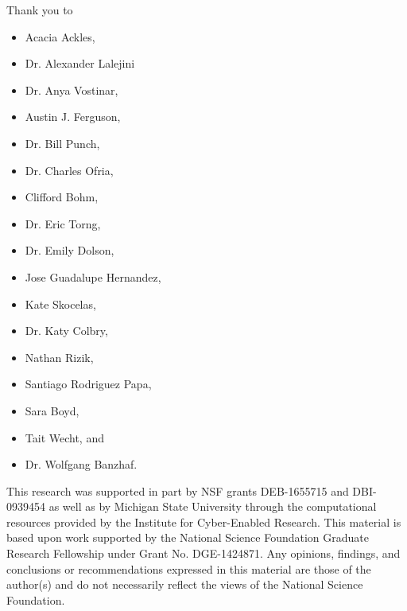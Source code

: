 Thank you to
\begin{itemize}
  \item Acacia Ackles,
  \item Dr. Alexander Lalejini
  \item Dr. Anya Vostinar,
  \item Austin J. Ferguson,
  \item Dr. Bill Punch,
  \item Dr. Charles Ofria,
  \item Clifford Bohm,
  \item Dr. Eric Torng,
  \item Dr. Emily Dolson,
  \item Jose Guadalupe Hernandez,
  \item Kate Skocelas,
  \item Dr. Katy Colbry,
  \item Nathan Rizik,
  \item Santiago Rodriguez Papa,
  \item Sara Boyd,
  \item Tait Wecht, and
  \item Dr. Wolfgang Banzhaf.
\end{itemize}

This research was supported in part by NSF grants DEB-1655715 and DBI-0939454 as well as by Michigan State University through the computational resources provided by the Institute for Cyber-Enabled Research.
This material is based upon work supported by the National Science Foundation Graduate Research Fellowship under Grant No. DGE-1424871.
Any opinions, findings, and conclusions or recommendations expressed in this material are those of the author(s) and do not necessarily reflect the views of the National Science Foundation.
